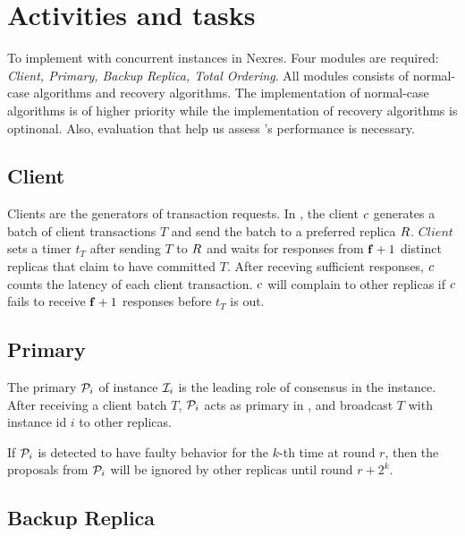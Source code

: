 \section{Activities and tasks}

\par To implement \RCC{} with concurrent \PBFT{} instances in Nexres. Four modules are required: \emph{Client, 
Primary, Backup Replica, Total Ordering}. All modules consists of normal-case algorithms and recovery algorithms. 
The implementation of normal-case algorithms is of higher priority while the implementation of recovery algorithms 
is optinonal. Also, evaluation that help us assess \RCC{}'s performance is necessary.

\subsection{Client}

\par Clients are the generators of transaction requests. In \RCC{}, the client $\Client{}$ generates a batch 
of client transactions $T$ and send the batch to a preferred replica $\Replica{}$. $Client{}$ sets a timer 
$t_T$ after sending $T$ to $\Replica{}$ and waits for responses from $\mathbf{f}+1$ distinct replicas that claim 
to have committed $T$. After receving sufficient responses, $\Client{}$ counts the latency of each client 
transaction. $\Client{}$ will complain to other replicas if $\Client{}$ fails to receive $\mathbf{f}+1$ responses 
before $t_T$ is out.

\subsection{Primary}

\par The primary $\mathcal{P}_{i}$ of instance $\mathcal{I}_{i}$ is the leading role of consensus in the 
instance. After receiving a client batch $T$, $\mathcal{P}_{i}$ acts as primary in \PBFT{}, and broadcast $T$ 
with instance id $i$ to other replicas.

\par If $\mathcal{P}_{i}$ is detected to have faulty behavior for the $k$-th time at round $r$, then the proposals 
from $\mathcal{P}_{i}$ will be ignored by other replicas until round $r + 2^k$.

\subsection{Backup Replica}

